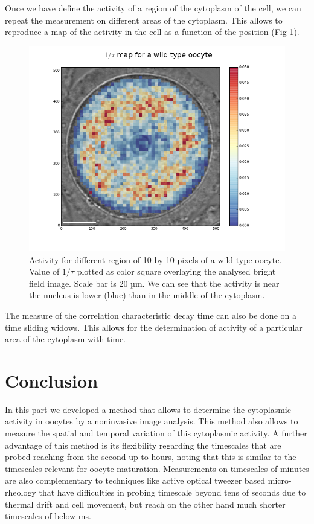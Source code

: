 \documentclass[A4paperpaper,11pt,english]{sphinxmanual}
\begin{document}
Once we have define the activity of a region of the cytoplasm of the cell, we
can repeat the measurement on different areas of the cytoplasm. This allows to
reproduce a map of the activity in the cell as a function of the position (\hyperref[index-latex:fig-activity-map]{Fig  \ref*{index-latex:fig-activity-map}}).
\begin{figure}[htbp]
\centering
\capstart

\includegraphics[width=0.950\linewidth]{CellAct-WT.png}
\caption{Activity for different region of  10 by 10 pixels of a wild type oocyte.
Value of \(1/\tau\) plotted as color square overlaying the
analysed bright field image. Scale
bar is 20 µm. We can see that the activity is near the nucleus is lower
(blue) than in the middle of the cytoplasm.}\label{index-latex:fig-activity-map}\end{figure}

The measure of the correlation characteristic decay time can also be done on a
time sliding widows. This allows for the determination of activity of a
particular area of the cytoplasm with time.


\section{Conclusion}
\label{index-latex:conclusion}
In this part we developed a method that allows to determine the cytoplasmic
activity in oocytes by a noninvasive image analysis. This method also allows
to measure the spatial and temporal variation of this cytoplasmic
activity. A further advantage of this method is its flexibility regarding the timescales
that are probed reaching from the second up to hours, noting that this is similar to the
timescales relevant for oocyte maturation. Measurements on timescales of minutes are also
complementary to techniques like active optical tweezer based micro-rheology that have difficulties in probing
timescale beyond tens of seconds due to thermal drift and cell movement, but
reach on the other hand much shorter timescales of below ms.
\end{document}
